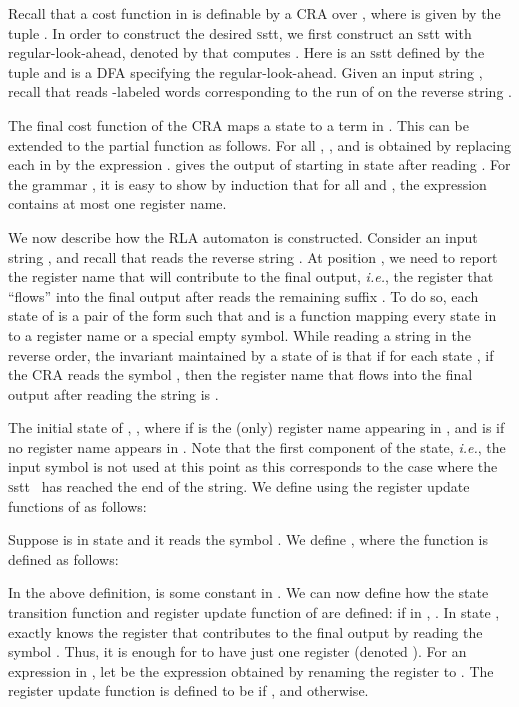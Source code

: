 \documentclass[11pt]{article}
\newcommand{\SSTT}{{\sc\textsc sstt}\xspace}
\newcommand{\EDWA}{{CRA}\xspace}
\newcommand{\ie}{{\em i.e.}\xspace}
\begin{document}
Recall that a cost function in  is definable
by a \EDWA  over , where  is given
by the tuple
.
In order to construct the desired \SSTT , we first construct an
\SSTT with regular-look-ahead, denoted by  that computes
.  Here  is an \SSTT defined by the tuple
 and  is a DFA 
specifying the regular-look-ahead. Given an input string , recall
that  reads -labeled words corresponding to the run of 
on the reverse string .

The final cost function  of the \EDWA  maps a state
to a term in . This can be extended to the partial function
 as follows. For
all , , and
 is obtained by replacing each  in
 by the expression .
 gives the output of  starting in state 
after reading . For the grammar , it is easy to
show by induction that for all  and , the expression
 contains at most one register name.

We now describe how the RLA automaton  is
constructed.  Consider an input string , and recall
that  reads the reverse string .  At position , we need 
to report the register name that will contribute to the final output,
\ie, the register that ``flows'' into the final output after 
reads the remaining suffix . To do so, each state
of  is a pair  of the form  such that
 and
 is a
function mapping every state in  to a register name or a
special empty symbol.  While reading a string  in the
reverse order, the invariant maintained by a state  of 
is that if for each state , if the \EDWA 
reads the symbol , then the register name that flows into the
final output after reading the string  is
.



The initial state of , , where
 if  is the (only) register name appearing in
, and is  if no register name appears in
. Note that the first component of the state, \ie, the
input symbol is not used at this point as this corresponds to the case
where the \SSTT~ has reached the end of the string. We define
 using the register update functions of  as follows:

Suppose  is in state  and it reads the symbol
.  We define , where
the function  is defined as follows:



In the above definition,  is some constant in .
We can now define how the state transition function  and
register update function  of  are defined:
 if in , .  In
state ,  exactly knows the register  that
contributes to the final output by reading the symbol .
Thus, it is enough for  to have just one register (denoted
).  For an expression  in , let  be the
expression obtained by renaming the register  to .  The register
update function  is defined to be
 if ,
and  otherwise.
\end{document}
